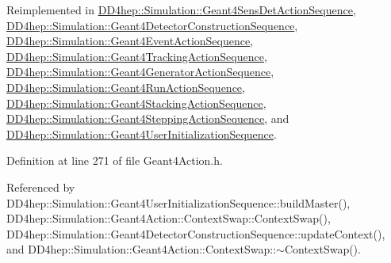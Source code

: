 Reimplemented in \hyperlink{class_d_d4hep_1_1_simulation_1_1_geant4_sens_det_action_sequence_a5878271f8da03d02bf4b3b8145246775}{D\+D4hep\+::\+Simulation\+::\+Geant4\+Sens\+Det\+Action\+Sequence}, \hyperlink{class_d_d4hep_1_1_simulation_1_1_geant4_detector_construction_sequence_a2ccfc854d0b38a4b1547422c2779e346}{D\+D4hep\+::\+Simulation\+::\+Geant4\+Detector\+Construction\+Sequence}, \hyperlink{class_d_d4hep_1_1_simulation_1_1_geant4_event_action_sequence_a26291513e94aec2a01464d0121532999}{D\+D4hep\+::\+Simulation\+::\+Geant4\+Event\+Action\+Sequence}, \hyperlink{class_d_d4hep_1_1_simulation_1_1_geant4_tracking_action_sequence_a7afac2362f030a76e39cbdc7ab5b0ee7}{D\+D4hep\+::\+Simulation\+::\+Geant4\+Tracking\+Action\+Sequence}, \hyperlink{class_d_d4hep_1_1_simulation_1_1_geant4_generator_action_sequence_a52b0d18dd3c29e1b1e133d9e1c73284b}{D\+D4hep\+::\+Simulation\+::\+Geant4\+Generator\+Action\+Sequence}, \hyperlink{class_d_d4hep_1_1_simulation_1_1_geant4_run_action_sequence_ad94eee6a819a88302a0eaa0874d88fa3}{D\+D4hep\+::\+Simulation\+::\+Geant4\+Run\+Action\+Sequence}, \hyperlink{class_d_d4hep_1_1_simulation_1_1_geant4_stacking_action_sequence_a093447274a6d135bc1d69fe96ed0961c}{D\+D4hep\+::\+Simulation\+::\+Geant4\+Stacking\+Action\+Sequence}, \hyperlink{class_d_d4hep_1_1_simulation_1_1_geant4_stepping_action_sequence_aababd8e6f650101a6ade162f82a29f61}{D\+D4hep\+::\+Simulation\+::\+Geant4\+Stepping\+Action\+Sequence}, and \hyperlink{class_d_d4hep_1_1_simulation_1_1_geant4_user_initialization_sequence_ae73630ce8b3759e3793dc58f585a291b}{D\+D4hep\+::\+Simulation\+::\+Geant4\+User\+Initialization\+Sequence}.



Definition at line 271 of file Geant4\+Action.\+h.



Referenced by D\+D4hep\+::\+Simulation\+::\+Geant4\+User\+Initialization\+Sequence\+::build\+Master(), D\+D4hep\+::\+Simulation\+::\+Geant4\+Action\+::\+Context\+Swap\+::\+Context\+Swap(), D\+D4hep\+::\+Simulation\+::\+Geant4\+Detector\+Construction\+Sequence\+::update\+Context(), and D\+D4hep\+::\+Simulation\+::\+Geant4\+Action\+::\+Context\+Swap\+::$\sim$\+Context\+Swap().

\hypertarget{class_d_d4hep_1_1_simulation_1_1_geant4_action_ae62935fef8595dbc8c1d7f9c278523e4}{}\label{class_d_d4hep_1_1_simulation_1_1_geant4_action_ae62935fef8595dbc8c1d7f9c278523e4} 
